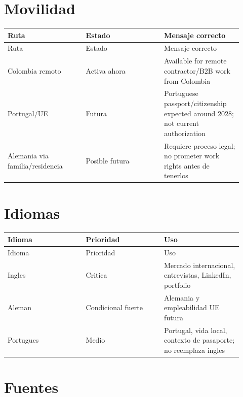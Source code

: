 \section{Movilidad}


\begin{center}
\scriptsize
\begin{longtable}{>{\raggedright\arraybackslash}p{0.305\linewidth} >{\raggedright\arraybackslash}p{0.305\linewidth} >{\raggedright\arraybackslash}p{0.305\linewidth}}
\toprule
Ruta & Estado & Mensaje correcto \\
\midrule
\endfirsthead
\toprule
Ruta & Estado & Mensaje correcto \\
\midrule
\endhead
Colombia remoto & Activa ahora & Available for remote contractor/B2B work from Colombia \\
Portugal/UE & Futura & Portuguese passport/citizenship expected around 2028; not current authorization \\
Alemania via familia/residencia & Posible futura & Requiere proceso legal; no prometer work rights antes de tenerlos \\
\bottomrule
\end{longtable}
\end{center}


\section{Idiomas}


\begin{center}
\scriptsize
\begin{longtable}{>{\raggedright\arraybackslash}p{0.305\linewidth} >{\raggedright\arraybackslash}p{0.305\linewidth} >{\raggedright\arraybackslash}p{0.305\linewidth}}
\toprule
Idioma & Prioridad & Uso \\
\midrule
\endfirsthead
\toprule
Idioma & Prioridad & Uso \\
\midrule
\endhead
Ingles & Critica & Mercado internacional, entrevistas, LinkedIn, portfolio \\
Aleman & Condicional fuerte & Alemania y empleabilidad UE futura \\
Portugues & Medio & Portugal, vida local, contexto de pasaporte; no reemplaza ingles \\
\bottomrule
\end{longtable}
\end{center}


\section{Fuentes}


